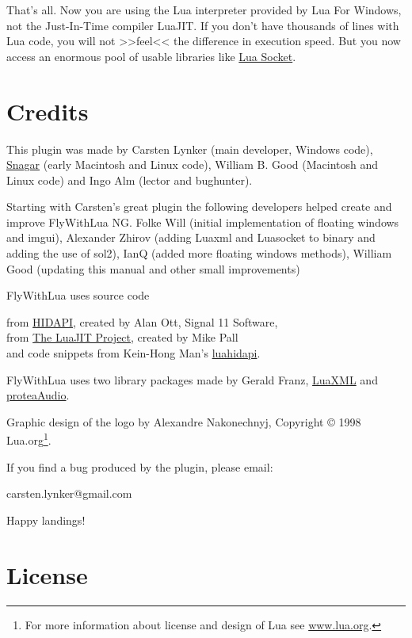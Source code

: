 \documentclass[11pt,parskip=half,a4paper]{scrartcl}
\begin{document}
That's all. Now you are using the Lua interpreter provided by Lua For Windows, not the Just-In-Time compiler LuaJIT. If you don't have thousands of lines with Lua code, you will not >>feel<< the difference in execution speed. But you now access an enormous pool of usable libraries like \href{http://w3.impa.br/~diego/software/luasocket/}{Lua Socket}.

\newpage
\section{Credits}

This plugin was made by Carsten Lynker (main developer, Windows code), \href{http://www.snagar.org/}{Snagar} (early Macintosh and Linux code), William B. Good (Macintosh and Linux code) and Ingo Alm (lector and bughunter).

Starting with Carsten's great plugin the following developers helped create and improve FlyWithLua NG. Folke Will (initial implementation of floating windows and imgui), Alexander Zhirov (adding Luaxml and Luasocket to binary and adding the use of sol2), IanQ (added more floating windows methods), William Good (updating this manual and other small improvements) 

FlyWithLua uses source code

from \href{http://www.signal11.us/oss/hidapi/}{HIDAPI}, created by Alan Ott, Signal 11 Software,\\
from \href{http://luajit.org/}{The LuaJIT Project}, created by Mike Pall\\
and code snippets from Kein-Hong Man's \href{https://sites.google.com/site/rubblepiles/hardware-stuff}{luahidapi}.

FlyWithLua uses two library packages made by Gerald Franz, \href{http://viremo.eludi.net/LuaXML/index.html}{LuaXML} and \href{http://viremo.eludi.net/proteaAudio/proteaaudiolua.html}{proteaAudio}.

Graphic design of the logo by Alexandre Nakonechnyj, Copyright © 1998 Lua.org\footnote{For more information about license and design of Lua see \url{www.lua.org}.}.

If you find a bug produced by the plugin, please email:

carsten.lynker@gmail.com

Happy landings!

\newpage
\section{License}
\end{document}
